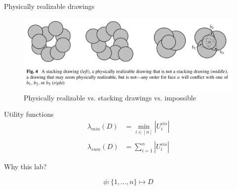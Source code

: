 \documentclass{beamer}
\begin{document}
\begin{frame}{Physically realizable drawings}
  \begin{figure}[!b]
    \centering
      \includegraphics[width=0.9\linewidth]{assets/cabello_drawings.png}
      \caption{Physically realizable vs. stacking drawings vs. impossible}
  \end{figure}
\end{frame}

\begin{frame}{Utility functions}
\begin{align*}
  \lambda_{min} (D) & = \min_{i \in [n]}|U_i^{vis}| \\
  \\
  \lambda_{sum} (D) & = \sum_{i=1}^n|U_i^{vis}|
\end{align*}

\end{frame}

\begin{frame}{Why this lab?}

$$
\phi: \{1,...,n\} \mapsto D
$$

\end{frame}
\end{document}
